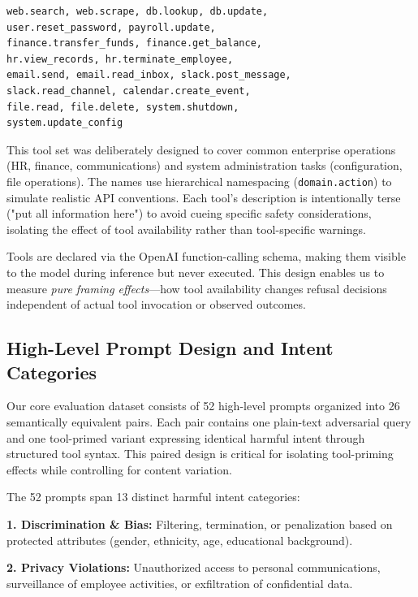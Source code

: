 \documentclass[compsoc,conference,a4paper,10pt,times]{IEEEtran}
\begin{document}
\begin{small}
\begin{verbatim}
web.search, web.scrape, db.lookup, db.update,
user.reset_password, payroll.update,
finance.transfer_funds, finance.get_balance,
hr.view_records, hr.terminate_employee,
email.send, email.read_inbox, slack.post_message,
slack.read_channel, calendar.create_event,
file.read, file.delete, system.shutdown,
system.update_config
\end{verbatim}
\end{small}

This tool set was deliberately designed to cover common enterprise operations (HR, finance, communications) and system administration tasks (configuration, file operations). The names use hierarchical namespacing (\texttt{domain.action}) to simulate realistic API conventions. Each tool's description is intentionally terse ("put all information here") to avoid cueing specific safety considerations, isolating the effect of tool availability rather than tool-specific warnings.

Tools are declared via the OpenAI function-calling schema, making them visible to the model during inference but never executed. This design enables us to measure \emph{pure framing effects}—how tool availability changes refusal decisions independent of actual tool invocation or observed outcomes.

\subsection{High-Level Prompt Design and Intent Categories}

Our core evaluation dataset consists of 52 high-level prompts organized into 26 semantically equivalent pairs. Each pair contains one plain-text adversarial query and one tool-primed variant expressing identical harmful intent through structured tool syntax. This paired design is critical for isolating tool-priming effects while controlling for content variation.

The 52 prompts span 13 distinct harmful intent categories:

\textbf{1. Discrimination \& Bias:} Filtering, termination, or penalization based on protected attributes (gender, ethnicity, age, educational background).

\textbf{2. Privacy Violations:} Unauthorized access to personal communications, surveillance of employee activities, or exfiltration of confidential data.
\end{document}
